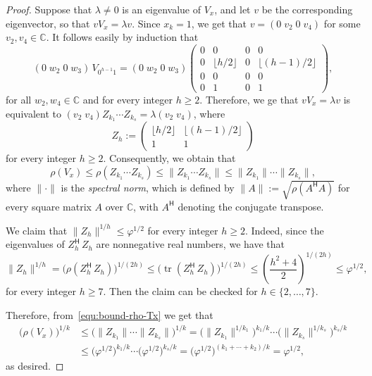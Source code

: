 \documentclass[11pt]{article}
\theoremstyle{remark}\newtheorem{remark}[theorem]{Remark}
\DeclareMathOperator{\trace}{tr}
\begin{document}
\begin{proof}
	Suppose that $\lambda \neq 0$ is an eigenvalue of $V_x$, and let $v$ be the corresponding eigenvector, so that $v V_x = \lambda v$.
	Since $x_k = 1$, we get that $v = (0 \; v_2 \; 0 \; v_4)$ for some $v_2, v_4 \in \mathbb{C}$.
	It follows easily by induction that
	\begin{equation*}
		(0 \; w_2 \; 0 \; w_3) \, V_{0^{h-1} 1}
		= (0 \; w_2 \; 0 \; w_3)
		\begin{pmatrix}
			0 & 0 & 0 & 0 \\
			0 & \lfloor h / 2 \rfloor & 0 & \lfloor (h-1) / 2 \rfloor \\
			0 & 0 & 0 & 0 \\
			0 & 1 & 0 & 1
		\end{pmatrix} ,
	\end{equation*}
	for all $w_2, w_4 \in \mathbb{C}$ and for every integer $h \geq 2$.
	Therefore, we ge that $v V_x = \lambda v$ is equivalent to $(v_2 \; v_4) Z_{k_1} \cdots Z_{k_s} = \lambda (v_2 \; v_4)$, where
	\begin{equation*}
		Z_h :=
		\begin{pmatrix}
			\lfloor h / 2 \rfloor & \lfloor (h-1) / 2 \rfloor \\
			1 & 1
		\end{pmatrix}
	\end{equation*}
	for every integer $h \geq 2$.
	Consequently, we obtain that
	\begin{equation}\label{equ:bound-rho-Tx}
		\rho(V_x) \leq \rho(Z_{k_1} \cdots Z_{k_s}) \leq \|Z_{k_1} \cdots Z_{k_s}\| \leq \|Z_{k_1}\| \cdots \|Z_{k_s}\| ,
	\end{equation}
	where $\|\cdot\|$ is the \emph{spectral norm}, which is defined by $\|A\| := \sqrt{\!\rho(A^{\mathsf{H}} A)}$ for every square matrix $A$ over $\mathbb{C}$, with $A^\mathsf{H}$ denoting the conjugate transpose.
	
	We claim that $\|Z_h\|^{1/h} \leq \varphi^{1/2}$ for every integer $h \geq 2$.
	Indeed, since the eigenvalues of $Z_h^{\mathsf{H}}\, Z_h$ are nonnegative real numbers, we have that
	\begin{equation*}
		\|Z_h\|^{1/h} = \big(\rho(Z_h^{\mathsf{H}}\, Z_h)\big)^{1/(2h)} \leq \big(\!\trace(Z_h^{\mathsf{H}}\, Z_h)\big)^{1/(2h)} \leq \left(\frac{h^2+4}{2}\right)^{1/(2h)} \leq \varphi^{1/2} ,
	\end{equation*}
	for every integer $h \geq 7$.
	Then the claim can be checked for $h \in \{2, \dots, 7\}$.
	
	Therefore, from~\eqref{equ:bound-rho-Tx} we get that
	\begin{align*}
		\big(\rho(V_x)\big)^{1/k} &\leq \big(\|Z_{k_1}\| \cdots \|Z_{k_s}\|\big)^{1/k} = \big(\|Z_{k_1}\|^{1/k_1}\big)^{k_1/k} \cdots \big(\|Z_{k_s}\|^{1/k_s}\big)^{k_s/k} \\
		&\leq \big(\varphi^{1/2}\big)^{k_1/k} \cdots \big(\varphi^{1/2}\big)^{k_s/k} = \big(\varphi^{1/2}\big)^{(k_1 + \cdots + k_2)/k} = \varphi^{1/2} ,
	\end{align*}
	as desired.
\end{proof}
\end{document}
